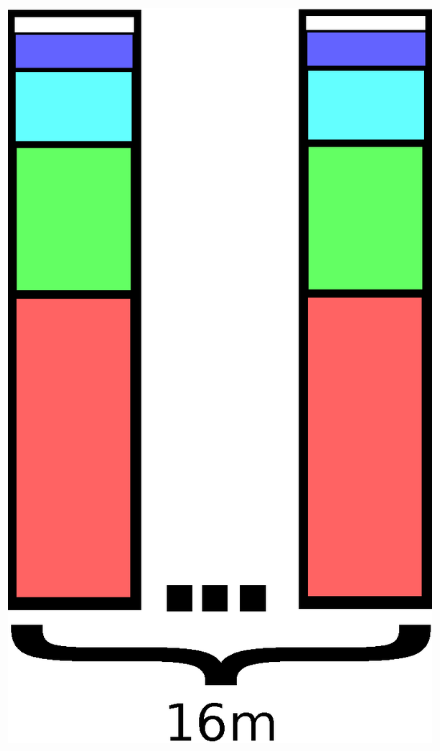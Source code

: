 \documentclass{article}
\begin{document}
\begin{multicols}{2}
\begin{figure}[H]
\begin{center}
	\includegraphics[scale=.3]{fourth}
\end{center}
\end{figure}
\end{multicols}
\end{document}
